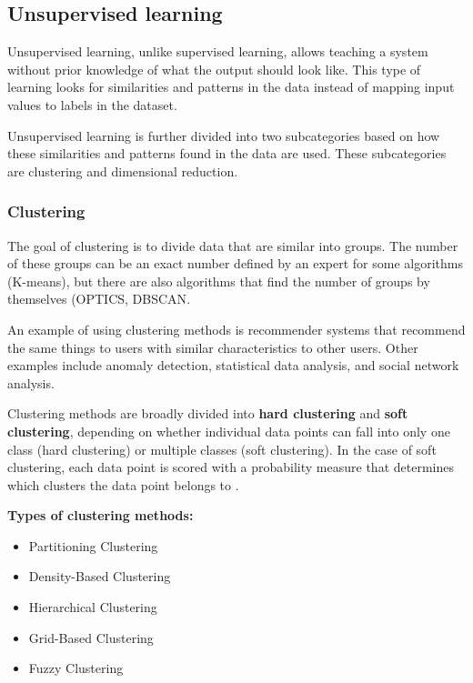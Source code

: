 \subsection{Unsupervised learning}
Unsupervised learning, unlike supervised learning, allows teaching a system without prior knowledge of what the output should look like. This type of learning looks for similarities and patterns in the data instead of mapping input values to labels in the dataset.\cite{coursera-ml}

Unsupervised learning is further divided into two subcategories based on how these similarities and patterns found in the data are used. These subcategories are clustering and dimensional reduction.

\subsubsection{Clustering}

The goal of clustering is to divide data that are similar into groups\cite{ml-types2}. The number of these groups can be an exact number defined by an expert for some algorithms (K-means\cite{k-means}), but there are also algorithms that find the number of groups by themselves (OPTICS\cite{optics}, DBSCAN\cite{dbscan}.

An example of using clustering methods is recommender systems that recommend the same things to users with similar characteristics to other users. Other examples include anomaly detection, statistical data analysis, and social network analysis\cite{clustering-applications}.

Clustering methods are broadly divided into \textbf{hard clustering} and \textbf{soft clustering}, depending on whether individual data points can fall into only one class (hard clustering) or multiple classes (soft clustering). In the case of soft clustering, each data point is scored with a probability measure that determines which clusters the data point belongs to \cite{clustering-types}. 

\textbf{Types of clustering methods:}
\begin{itemize}
    \item Partitioning Clustering
    \item Density-Based Clustering
    \item Hierarchical Clustering
    \item Grid-Based Clustering
    \item Fuzzy Clustering
\end{itemize}

